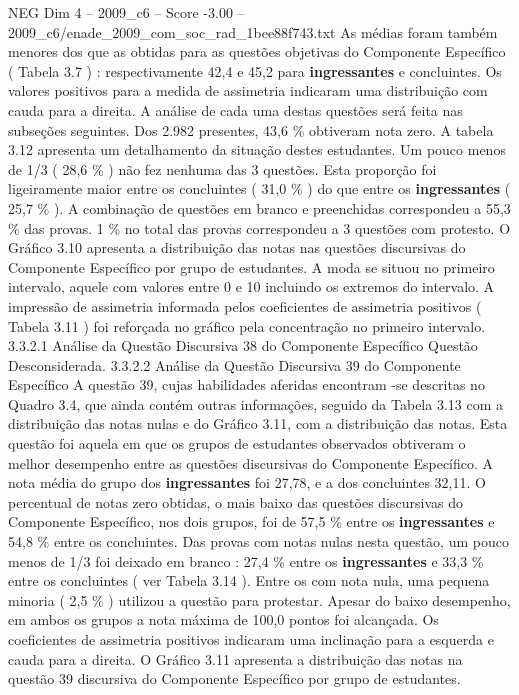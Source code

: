 \begin{textsample}{NEG Dim 4 – 2009\_c6 – Score -3.00 – 2009\_c6/enade\_2009\_com\_soc\_rad\_1bee88f743.txt}
As médias foram também menores dos que as obtidas para as questões objetivas do Componente Específico ( Tabela 3.7 ) : respectivamente 42,4 e 45,2 para \textbf{ingressantes} e concluintes.
Os valores positivos para a medida de assimetria indicaram uma distribuição com cauda para a direita.
A análise de cada uma destas questões será feita nas subseções seguintes.
Dos 2.982 presentes, 43,6 \% obtiveram nota zero.
A tabela 3.12 apresenta um detalhamento da situação destes estudantes.
Um pouco menos de 1/3 ( 28,6 \% ) não fez nenhuma das 3 questões.
Esta proporção foi ligeiramente maior entre os concluintes ( 31,0 \% ) do que entre os \textbf{ingressantes} ( 25,7 \% ).
A combinação de questões em branco e preenchidas correspondeu a 55,3 \% das provas. 1 \% no total das provas correspondeu a 3 questões com protesto.
O Gráfico 3.10 apresenta a distribuição das notas nas questões discursivas do Componente Específico por grupo de estudantes.
A moda se situou no primeiro intervalo, aquele com valores entre 0 e 10 incluindo os extremos do intervalo.
A impressão de assimetria informada pelos coeficientes de assimetria positivos ( Tabela 3.11 ) foi reforçada no gráfico pela concentração no primeiro intervalo. 3.3.2.1 Análise da Questão Discursiva 38 do Componente Específico Questão Desconsiderada. 3.3.2.2 Análise da Questão Discursiva 39 do Componente Específico A questão 39, cujas habilidades aferidas encontram -se descritas no Quadro 3.4, que ainda contém outras informações, seguido da Tabela 3.13 com a distribuição das notas nulas e do Gráfico 3.11, com a distribuição das notas.
Esta questão foi aquela em que os grupos de estudantes observados obtiveram o melhor desempenho entre as questões discursivas do Componente Específico.
A nota média do grupo dos \textbf{ingressantes} foi 27,78, e a dos concluintes 32,11.
O percentual de notas zero obtidas, o mais baixo das questões discursivas do Componente Específico, nos dois grupos, foi de 57,5 \% entre os \textbf{ingressantes} e 54,8 \% entre os concluintes.
Das provas com notas nulas nesta questão, um pouco menos de 1/3 foi deixado em branco : 27,4 \% entre os \textbf{ingressantes} e 33,3 \% entre os concluintes ( ver Tabela 3.14 ).
Entre os com nota nula, uma pequena minoria ( 2,5 \% ) utilizou a questão para protestar.
Apesar do baixo desempenho, em ambos os grupos a nota máxima de 100,0 pontos foi alcançada.
Os coeficientes de assimetria positivos indicaram uma inclinação para a esquerda e cauda para a direita.
O Gráfico 3.11 apresenta a distribuição das notas na questão 39 discursiva do Componente Específico por grupo de estudantes.

\end{textsample}
